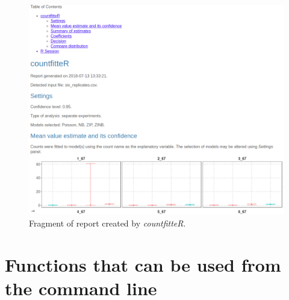 \begin{figure}[htbp]
  \centering
  \includegraphics[width=0.99\columnwidth]{cj_rep}
  \caption{Fragment of report created by \emph{countfitteR}.}
  \label{figure:cj_rep.png}
\end{figure}

% 

\section{Functions that can be used from the command line}

